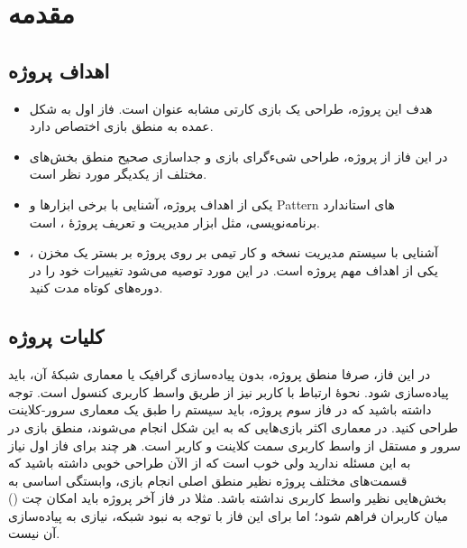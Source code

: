 \documentclass[]{article}
\begin{document}
\newpage

\section*{{\titr مقدمه}}

\subsection*{{\titr اهداف پروژه}}


\begin{itemize}

\item
هدف این پروژه، طراحی یک بازی کارتی مشابه عنوان  است. فاز اول به شکل عمده به منطق بازی اختصاص دارد.


\item
در این فاز از پروژه، طراحی شی‌ءگرای بازی و جداسازی صحیح منطق بخش‌های مختلف از یکدیگر مورد نظر است.

\item
یکی از اهداف پروژه، آشنایی با برخی ابزارها و Pattern های استاندارد برنامه‌نویسی، مثل ابزار مدیریت و تعریف پروژه‌ٔ 
\href{https://en.wikipedia.org/wiki/Apache_Maven}{\textcolor{blue}{\underline{}}}، 
است.

\item
آشنایی با سیستم مدیریت نسخه  و کار تیمی بر روی پروژه بر بستر یک مخزن ، یکی از اهداف مهم پروژه است. در این مورد توصیه می‌شود تغییرات خود را در دوره‌های کوتاه مدت  کنید.

\end{itemize}

\subsection*{{\titr کلیات پروژه}}

در این فاز، صرفا منطق پروژه، بدون پیاده‌سازی گرافیک یا معماری شبکهٔ آن، باید پیاده‌سازی شود. نحوهٔ ارتباط با کاربر نیز از طریق واسط کاربری کنسول است. توجه داشته باشید که در فاز سوم پروژه، باید سیستم را طبق یک معماری سرور-کلاینت طراحی کنید. در معماری اکثر بازی‌هایی که به این شکل انجام می‌شوند، منطق بازی در سرور و مستقل از واسط کاربری سمت کلاینت و کاربر است. هر چند برای فاز اول نیاز به این مسئله ندارید ولی خوب‌ است که از الآن طراحی خوبی داشته باشید که قسمت‌های مختلف پروژه نظیر منطق اصلی انجام بازی، وابستگی اساسی به بخش‌هایی نظیر واسط کاربری نداشته باشد. مثلا در فاز‌ آخر پروژه باید امکان چت () میان کاربران فراهم 
شود؛ اما برای این فاز با توجه به نبود شبکه، نیازی به پیاده‌سازی آن نیست.
\end{document}
